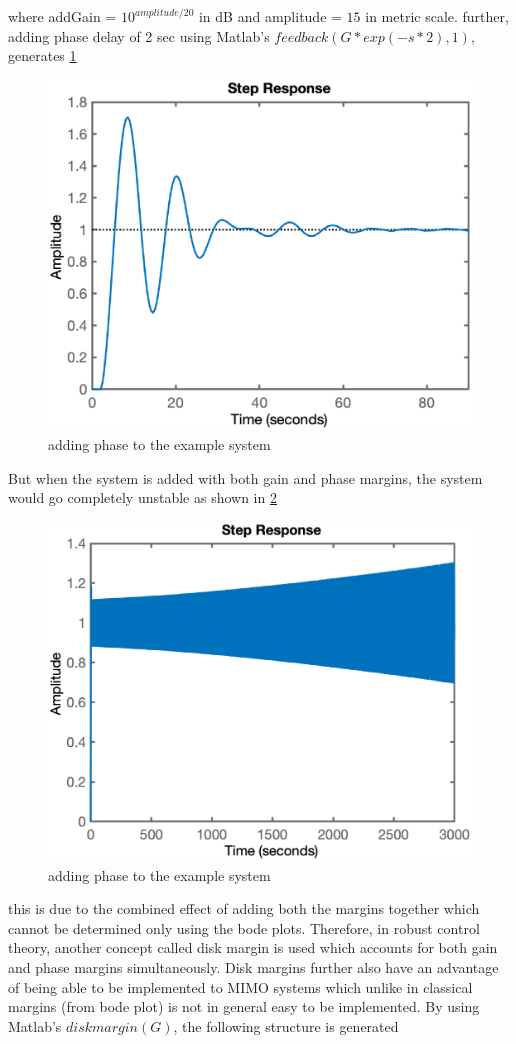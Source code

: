 \newpage
where addGain = $10^{amplitude / 20}$ in dB and amplitude = $15$ in metric scale. further, adding phase delay of 2 sec using Matlab's $feedback(G*exp(-s*2),1)$, generates \ref{fig_2_ch_RC_intro_3}
\begin{figure}[h!]
	\centering
	\includegraphics[width=0.75\linewidth]{Bilder/Matlab_RobustControl_Intro_3.eps}
	\caption{adding phase to the example system}
	\label{fig_2_ch_RC_intro_3}
\end{figure}
\newpage
But when the system is added with both gain and phase margins, the system would go completely unstable as shown in \ref{fig_2_ch_RC_intro_4}
\begin{figure}[h!]
	\centering
	\includegraphics[width=0.75\linewidth]{Bilder/Matlab_RobustControl_Intro_4.eps}
	\caption{adding phase to the example system}
	\label{fig_2_ch_RC_intro_4}
\end{figure}
this is due to the combined effect of adding both the margins together which cannot be determined only using the bode plots. Therefore, in robust control theory, another concept called disk margin is used which accounts for both gain and phase margins simultaneously. Disk margins further also have an advantage of being able to be implemented to MIMO systems which unlike in classical margins (from bode plot) is not in general easy to be implemented. By using Matlab's $diskmargin(G)$, the following structure is generated
